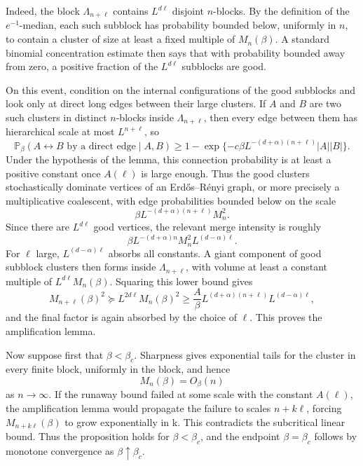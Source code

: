 \documentclass[11pt,reqno]{book}
\numberwithin{equation}{chapter}
\theoremstyle{plain}
\theoremstyle{definition}
\theoremstyle{remark}
\newcommand{\1}{\mathbf 1}
\newcommand{\suc}{\succeq}
\begin{document}
Indeed, the block \(\Lambda_{n+\ell}\) contains \(L^{d\ell}\) disjoint
\(n\)-blocks. By the definition of the \(e^{-1}\)-median, each such subblock
has probability bounded below, uniformly in \(n\), to contain a cluster of
size at least a fixed multiple of \(M_n(\beta)\). A standard binomial
concentration estimate then says that with probability bounded away from
zero, a positive fraction of the \(L^{d\ell}\) subblocks are good.

On this event, condition on the internal configurations of the good
subblocks and look only at direct long edges between their large clusters.
If \(A\) and \(B\) are two such clusters in distinct \(n\)-blocks inside
\(\Lambda_{n+\ell}\), then every edge between them has hierarchical scale
at most \(L^{n+\ell}\), so
\[
  \mathbb P_\beta(A\leftrightarrow B\text{ by a direct edge}
  \mid A,B)
  \geq
  1-\exp\{-c\beta L^{-(d+\alpha)(n+\ell)}|A||B|\}.
\]
Under the hypothesis of the lemma, this connection probability is at least a
positive constant once \(A(\ell)\) is large enough. Thus the good clusters
stochastically dominate vertices of an Erdős--Rényi graph, or more precisely
a multiplicative coalescent, with edge probabilities bounded below on the
scale
\[
  \beta L^{-(d+\alpha)(n+\ell)}M_n^2.
\]
Since there are \(L^{d\ell}\) good vertices, the relevant merge intensity is
roughly
\[
  \beta L^{-(d+\alpha)n}M_n^2 L^{(d-\alpha)\ell}.
\]
For \(\ell\) large, \(L^{(d-\alpha)\ell}\) absorbs all constants. A giant
component of good subblock clusters then forms inside \(\Lambda_{n+\ell}\),
with volume at least a constant multiple of \(L^{d\ell}M_n(\beta)\). Squaring
this lower bound gives
\[
  M_{n+\ell}(\beta)^2
  \suc
  L^{2d\ell}M_n(\beta)^2
  \geq
  \frac A\beta L^{(d+\alpha)(n+\ell)}
  L^{(d-\alpha)\ell},
\]
and the final factor is again absorbed by the choice of \(\ell\). This proves
the amplification lemma.

Now suppose first that \(\beta<\beta_c\). Sharpness gives exponential tails
for the cluster in every finite block, uniformly in the block, and hence
\[
  M_n(\beta)=O_\beta(n)
\]
as \(n\to\infty\). If the runaway bound failed at some scale with the
constant \(A(\ell)\), the amplification lemma would propagate the failure to
scales \(n+k\ell\), forcing \(M_{n+k\ell}(\beta)\) to grow exponentially in
k. This contradicts the subcritical linear bound. Thus the proposition holds
for \(\beta<\beta_c\), and the endpoint \(\beta=\beta_c\) follows by
monotone convergence as \(\beta\uparrow\beta_c\).
\end{document}
